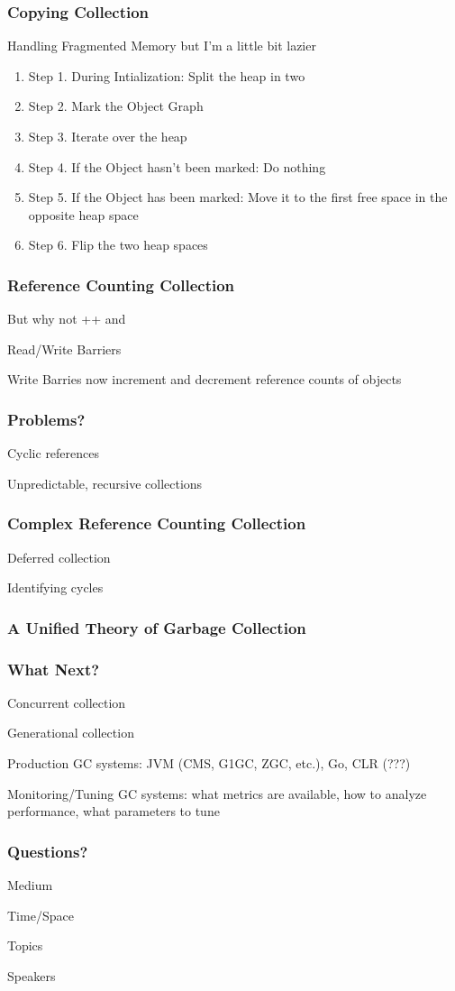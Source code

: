 \documentclass{beamer}
\begin{document}
\begin{frame}
  \frametitle{Copying Collection}
  \item Handling Fragmented Memory but I'm a little bit lazier
  \begin{enumerate}
    \item Step 1. During Intialization: Split the heap in two
    \item Step 2. Mark the Object Graph
    \item Step 3. Iterate over the heap
    \item Step 4. If the Object hasn't been marked: Do nothing
    \item Step 5. If the Object has    been marked: Move it to the first free space in the opposite heap space
    \item Step 6. Flip the two heap spaces
  \end{enumerate}
\end{frame}

\begin{frame}
  \frametitle{Reference Counting Collection}
  \item But why not ++ and \-\-
  \item Read/Write Barriers
  \item Write Barries now increment and decrement reference counts of objects
\end{frame}

\begin{frame}
  \frametitle{Problems?}
  \item Cyclic references
  \item Unpredictable, recursive collections
\end{frame}

\begin{frame}
  \frametitle{Complex Reference Counting Collection}
  \item Deferred collection
  \item Identifying cycles
\end{frame}

\begin{frame}
  \frametitle{A Unified Theory of Garbage Collection}
\end{frame}


\begin{frame}
  \frametitle{What Next?}
  \item Concurrent collection
  \item Generational collection
  \item Production GC systems: JVM (CMS, G1GC, ZGC, etc.), Go, CLR (???)
  \item Monitoring/Tuning GC systems: what metrics are available, how to analyze performance, what parameters to tune
\end{frame}

\begin{frame}
  \frametitle{Questions?}
  \item Medium
  \item Time/Space
  \item Topics
  \item Speakers
\end{frame}
\end{document}
